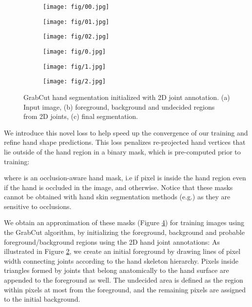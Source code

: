 \documentclass[10pt,twocolumn,letterpaper]{article}
\begin{document}
\begin{figure}[h!]
\center
\begin{subfigure}[t]{0.25\linewidth}
\texttt{[image: fig/00.jpg]}
\end{subfigure}
\begin{subfigure}[t]{0.25\linewidth}
\texttt{[image: fig/01.jpg]}
\end{subfigure}
\begin{subfigure}[t]{0.25\linewidth}
\texttt{[image: fig/02.jpg]}
\end{subfigure}
\par\addvspace{2pt}
\begin{subfigure}[t]{0.25\linewidth}
\texttt{[image: fig/0.jpg]}
\caption{}
\label{fig:seg1}
\end{subfigure}
\begin{subfigure}[t]{0.25\linewidth}
\texttt{[image: fig/1.jpg]}
\caption{}
\label{fig:seg2}
\end{subfigure}
\begin{subfigure}[t]{0.25\linewidth}
\texttt{[image: fig/2.jpg]}
\caption{}
\label{fig:seg3}
\end{subfigure}
\caption{GrabCut \cite{rother2004grabcut} hand segmentation initialized with 2D joint annotation.
(a) Input image, (b) foreground, background and undecided regions from 2D joints, (c) final segmentation.}
\label{fig:seg}
\end{figure}

We introduce this novel loss to help speed up the convergence of our training and refine hand shape predictions. This loss penalizes re-projected hand vertices that lie outside of the hand region in a binary mask, which is pre-computed prior to training:

where  is an occlusion-aware hand mask, i.e  if pixel  is inside the hand region even if the hand is occluded in the image, and  otherwise. Notice that these masks cannot be obtained with hand skin segmentation methods (e.g.\cite{Li_2013_CVPR,Bambach_2015_ICCV}) as they are sensitive to occlusions.    

We obtain an approximation of these masks (Figure \ref{fig:seg}) for training images using the GrabCut \cite{rother2004grabcut} algorithm, by initializing the foreground, background and probable foreground/background regions using the 2D hand joint annotations: As illustrated in Figure \ref{fig:seg2}, we create an initial foreground by drawing lines of  pixel width connecting joints according to the hand skeleton hierarchy. Pixels inside triangles formed by joints that belong anatomically to the hand surface are appended to the foreground as well. The undecided area is defined as the region within  pixels at most from the foreground, and the remaining pixels are assigned to the initial background.   
\end{document}
